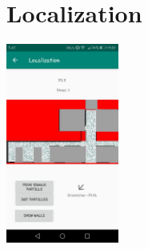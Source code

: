 \documentclass[12pt]{article}
\begin{document}
\pagebreak

\section{Localization}

\begin{center}
  \includegraphics[width=140px]{images/localization}
\end{center}
\end{document}
